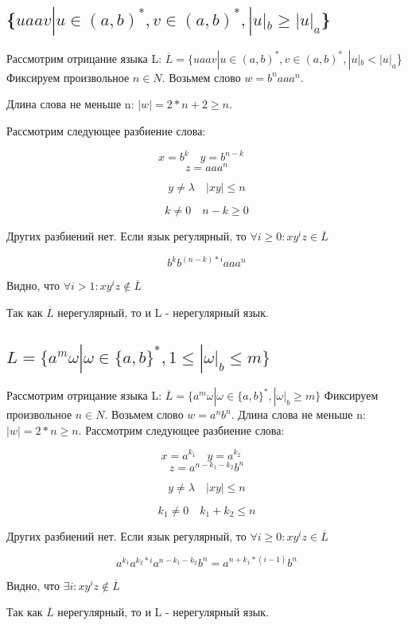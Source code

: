 \documentclass[a4paper,12pt]{article}
\begin{document}
\subsection{\{$uaav | u \in (a,b)^*, v \in (a,b)^*, |u|_b\geq |u|_a$\}}
Рассмотрим отрицание языка L: $\overline{L}= \{uaav | u \in (a,b)^*, v \in (a,b)^*, |u|_b < |u|_a$\}
\newline
Фиксируем произвольное $n\in N$. Возьмем слово $w = b^naaa^n$.

Длина слова не меньше n: $|w|=2*n+2\geq n$.

Рассмотрим следующее разбиение слова:

    $$x=b^{k} \quad  y=b^{n-k} \quad$$ $$z=aaa^n$$
    
    $$y\neq \lambda \quad |xy|\leq n$$
    
    $$k\neq 0\quad n-k \geq 0$$

Других разбиений нет.
Если язык регулярный, то $\forall i \geq 0: xy^iz \in \overline{L}$

    $$b^{k} b^{(n-k)*i} aaa^{n}$$
    
    Видно, что $\forall i>1: xy^iz \notin \overline{L}$ 
    
    Так как  {$\overline{L}$} нерегулярный, то и L - нерегулярный язык.
\subsection{$L=\{a^m\omega | \omega \in \{a,b\}^*, 1\leq |\omega|_b\leq m\}$}
Рассмотрим отрицание языка L: $\overline{L}=\{a^m\omega | \omega \in \{a,b\}^*, |\omega|_b\geq m\}$
\newline
Фиксируем произвольное $n\in N$. Возьмем слово $w = a^nb^n$.
\newline
Длина слова не меньше n: $|w|=2*n\geq n$.
\newline
Рассмотрим следующее разбиение слова:
\begin{center}
    $$x=a^{k_1} \quad  y=a^{k_2} \quad$$ $$z=a^{n-k_1-k_2}b^n$$
    
    $$y\neq \lambda \quad |xy|\leq n$$
    
    $$k_1\neq 0 \quad k_1+k_2\leq n$$
\end{center}
Других разбиений нет.
Если язык регулярный, то $\forall i \geq 0: xy^iz \in \overline{L}$

    $$a^{k_1} a^{k_2*i} a^{n-k_1-k_2}b^n = a^{n+k_1*(i-1)}b^n$$
    
    Видно, что $\exists i: xy^iz \notin \overline{L}$ 
    
    Так как  {$\overline{L}$} нерегулярный, то и L - нерегулярный язык.
\end{document}
